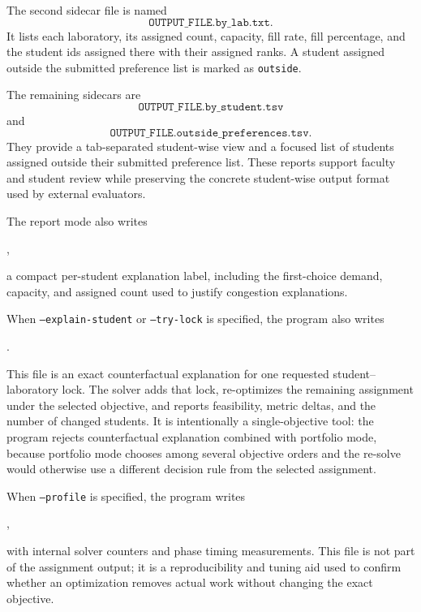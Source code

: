 \documentclass[11pt,a4paper]{article}
\begin{document}
The second sidecar file is named
\[
  \texttt{OUTPUT\_FILE.by\_lab.txt}.
\]
It lists each laboratory, its assigned count, capacity, fill rate, fill
percentage, and the student ids assigned there with their assigned ranks.  A
student assigned outside the submitted preference list is marked as
\texttt{outside}.

The remaining sidecars are
\[
  \texttt{OUTPUT\_FILE.by\_student.tsv}
\]
and
\[
  \texttt{OUTPUT\_FILE.outside\_preferences.tsv}.
\]
They provide a tab-separated student-wise view and a focused list of students
assigned outside their submitted preference list.  These reports support
faculty and student review while preserving the concrete student-wise output
format used by external evaluators.

The report mode also writes
\begin{center}
  {\small{}},
\end{center}
a compact per-student explanation label, including the first-choice demand,
capacity, and assigned count used to justify congestion explanations.

When \texttt{--explain-student} or \texttt{--try-lock} is specified, the
program also writes
\begin{center}
  {\small{}}.
\end{center}
This file is an exact counterfactual explanation for one requested
student--laboratory lock.  The solver adds that lock, re-optimizes the
remaining assignment under the selected objective, and reports feasibility,
metric deltas, and the number of changed students.
It is intentionally a single-objective tool: the program rejects
counterfactual explanation combined with portfolio mode, because portfolio
mode chooses among several objective orders and the re-solve would otherwise
use a different decision rule from the selected assignment.

When \texttt{--profile} is specified, the program writes
\begin{center}
  {\small{}},
\end{center}
with internal solver counters and phase timing measurements.  This file is not
part of the assignment output; it is a reproducibility and tuning aid used to
confirm whether an optimization removes actual work without changing the exact
objective.
\end{document}
